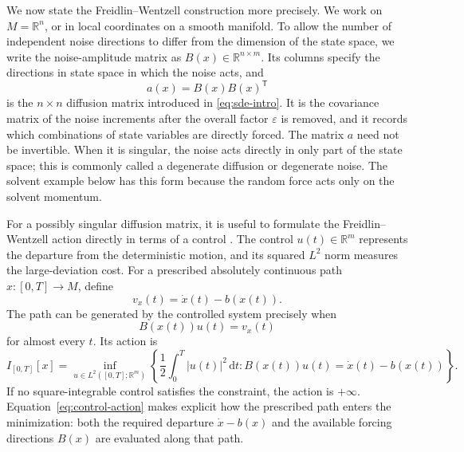 \documentclass[11pt]{article}
\theoremstyle{definition}
\theoremstyle{remark}
\newcommand{\R}{\mathbb{R}}
\newcommand{\eps}{\varepsilon}
\newcommand{\dd}{\mathrm{d}}
\newcommand{\cT}{\mathsf{T}}
\begin{document}
We now state the Freidlin--Wentzell construction more precisely.  We work on $M=\R^n$, or in local coordinates on a smooth manifold.  To allow the number of independent noise directions to differ from the dimension of the state space, we write the noise-amplitude matrix as $B(x)\in\R^{n\times m}$.  Its columns specify the directions in state space in which the noise acts, and
\begin{equation}
a(x)=B(x)B(x)^{\cT}
\label{eq:diffusion-matrix}
\end{equation}
is the $n\times n$ diffusion matrix introduced in \eqref{eq:sde-intro}.  It is the covariance matrix of the noise increments after the overall factor $\eps$ is removed, and it records which combinations of state variables are directly forced.  The matrix $a$ need not be invertible.  When it is singular, the noise acts directly in only part of the state space; this is commonly called a degenerate diffusion or degenerate noise.  The solvent example below has this form because the random force acts only on the solvent momentum.

For a possibly singular diffusion matrix, it is useful to formulate the Freidlin--Wentzell action directly in terms of a control \cite{FreidlinWentzell2012}.  The control $u(t)\in\R^m$ represents the departure from the deterministic motion, and its squared $L^2$ norm measures the large-deviation cost.  For a prescribed absolutely continuous path $x:[0,T]\to M$, define
\begin{equation}
v_x(t)=\dot x(t)-b(x(t)).
\label{eq:path-departure}
\end{equation}
The path can be generated by the controlled system precisely when
\begin{equation}
B(x(t))u(t)=v_x(t)
\label{eq:path-control-constraint}
\end{equation}
for almost every $t$.  Its action is
\begin{equation}
I_{[0,T]}[x]
=
\inf_{u\in L^2([0,T];\R^m)}
\left\{
\frac12\int_0^T |u(t)|^2\,\dd t:
B(x(t))u(t)=\dot x(t)-b(x(t))
\right\}.
\label{eq:control-action}
\end{equation}
If no square-integrable control satisfies the constraint, the action is $+\infty$.  Equation~\eqref{eq:control-action} makes explicit how the prescribed path enters the minimization: both the required departure $\dot x-b(x)$ and the available forcing directions $B(x)$ are evaluated along that path.
\end{document}
